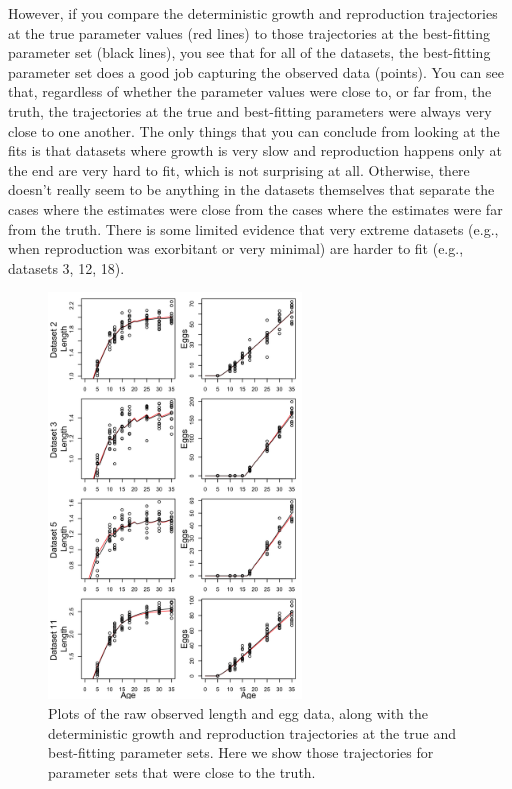 \documentclass[12pt,reqno,final,pdftex]{amsart}\usepackage[]{graphicx}\usepackage[]{color}
\newenvironment{knitrout}{}{} %
\theoremstyle{plain}
\numberwithin{equation}{part}
\begin{document}
\clearpage

However, if you compare the deterministic growth and reproduction trajectories at the true parameter values (red lines) to those trajectories at the best-fitting parameter set (black lines), you see that for all of the datasets, the best-fitting parameter set does a good job capturing the observed data (points).
You can see that, regardless of whether the parameter values were close to, or far from, the truth, the trajectories at the true and best-fitting parameters were always very close to one another.
The only things that you can conclude from looking at the fits is that datasets where growth is very slow and reproduction happens only at the end are very hard to fit, which is not surprising at all.
Otherwise, there doesn't really seem to be anything in the datasets themselves that separate the cases where the estimates were close from the cases where the estimates were far from the truth.
There is some limited evidence that very extreme datasets (e.g., when reproduction was exorbitant or very minimal) are harder to fit (e.g., datasets 3, 12, 18).

\begin{knitrout}\scriptsize
{}\color{fgcolor}\begin{figure}

\includegraphics[width=0.6\textwidth]{figure/unnamed-chunk-4-1} \hfill{}

\caption[Plots of the raw observed length and egg data, along with the deterministic growth and reproduction trajectories at the true and best-fitting parameter sets]{Plots of the raw observed length and egg data, along with the deterministic growth and reproduction trajectories at the true and best-fitting parameter sets. Here we show those trajectories for parameter sets that were close to the truth.}\label{fig:unnamed-chunk-4}
\end{figure}


\end{knitrout}
\end{document}
